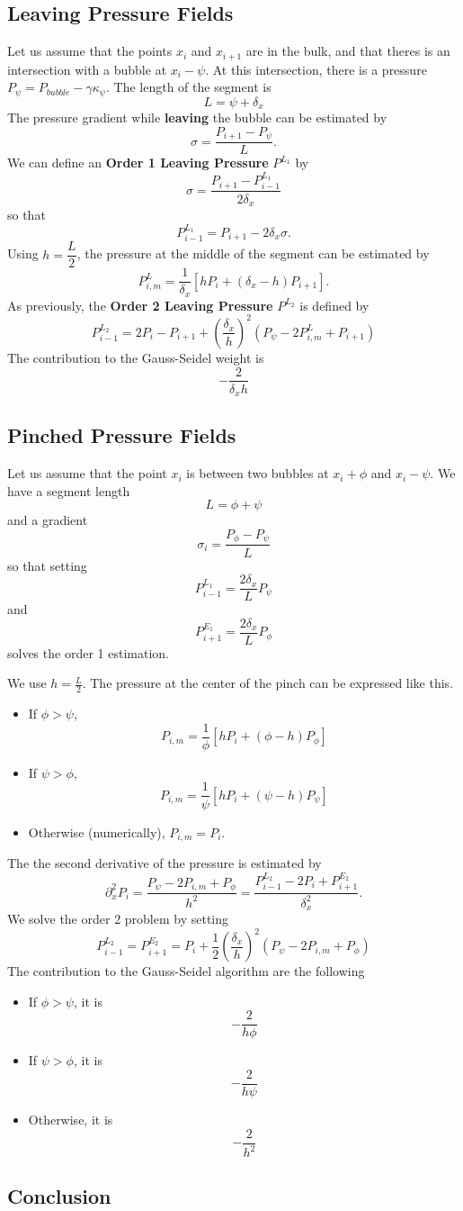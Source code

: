 \documentclass[aps]{revtex4}
\begin{document}
\subsection{Leaving Pressure Fields}
Let us assume that  the points $x_{i}$ and $x_{i+1}$ are in the bulk, and that
theres is an intersection with a bubble at $x_i-\psi$.
At this intersection, there is a pressure $P_\psi=P_{bubble} - \gamma \kappa_\psi$.
The length of the segment is
$$
	L = \psi+\delta_x
$$
The pressure gradient while \textbf{leaving} the bubble can be estimated by
$$
	\sigma = \dfrac{P_{i+1}-P_\psi}{L}.
$$
We can define an \textbf{Order 1 Leaving Pressure} $P^{L_1}$ by
$$
	\sigma = \dfrac{P_{i+1}-P^{L_1}_{i-1}}{2\delta_x}
$$
so that 
$$
	P^{L_1}_{i-1} = P_{i+1} - 2\delta_x \sigma.
$$
Using $h = \dfrac{L}{2}$, the pressure at the middle of the segment can be estimated
by
$$
	P_{i,m}^L = \dfrac{1}{\delta_x} \left\lbrack
	h P_i + \left(\delta_x - h\right) P_{i+1}
	\right\rbrack.
$$
As previously, the \textbf{Order 2 Leaving Pressure} $P^{L_2}$ is
defined by
$$
	P_{i-1}^{L_2} = 2P_i - P_{i+1} + \left(\dfrac{\delta_x}{h}\right)^2
	\left(
		P_\psi - 2P_{i,m}^L + P_{i+1}
	\right)
$$
The contribution to the Gauss-Seidel weight is
$$
	-\dfrac{2}{\delta_x h}
$$

\subsection{Pinched Pressure Fields}
Let us assume that the point $x_i$ is between two bubbles at $x_i+\phi$ and $x_i-\psi$.
We have a segment length 
$$
	L = \phi + \psi 
$$
and a gradient
$$
	\sigma_i = \dfrac{P_\phi - P_\psi}{L}
$$
so that setting
$$
	P^{L_1}_{i-1} = \dfrac{2\delta_x}{L} P_\psi
$$
and
$$
	P^{E_1}_{i+1} = \dfrac{2\delta_x}{L} P_\phi
$$
solves the order 1 estimation.

We use $h=\frac{L}{2}$.
The pressure at the center of the pinch can be expressed like this.
\begin{itemize}
\item If $\phi>\psi$, 
$$
	P_{i,m} = \dfrac{1}{\phi}
	\left\lbrack
		h P_i + \left(\phi-h\right) P_\phi
	\right\rbrack
$$
\item If $\psi>\phi$,  
	$$
		P_{i,m} = \dfrac{1}{\psi}
	\left\lbrack
		h P_i + \left(\psi-h\right) P_\psi
	\right\rbrack
$$
\item Otherwise (numerically), $P_{i,m}=P_i$.
\end{itemize}

The the second derivative of the pressure is estimated by
$$
	\partial_x^2 P_i = \dfrac{P_\psi - 2P_{i,m} + P_\phi}{h^2} =
	\dfrac{P^{L_2}_{i-1} - 2P_i + P^{E_2}_{i+1}}{\delta_x^2}.
$$
We solve the order 2 problem by setting
$$
	P^{L_2}_{i-1} = P^{E_2}_{i+1} = P_i + \dfrac{1}{2}\left(\dfrac{\delta_x}{h}\right)^2 \left( P_\psi - 2P_{i,m} + P_\phi \right)
$$
The contribution to the Gauss-Seidel algorithm are the following
\begin{itemize}
	\item If $\phi>\psi$, it is
	$$
		-\dfrac{2}{h\phi}
	$$
	\item If $\psi>\phi$, it is
	$$
		-\dfrac{2}{h\psi}
	$$
	\item Otherwise, it is 
	$$
		-\dfrac{2}{h^2}
	$$
\end{itemize}
\subsection{Conclusion}
\end{document}
